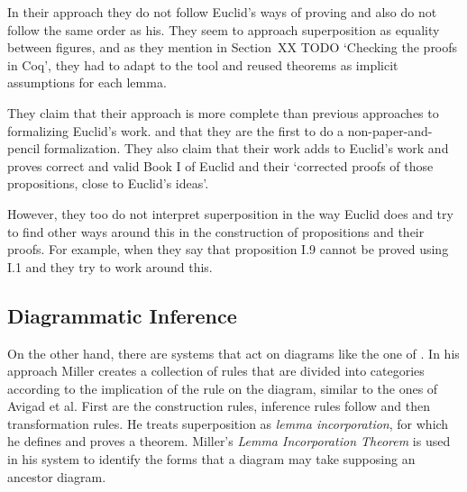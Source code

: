 \documentclass[]{interact}
\theoremstyle{plain}
\theoremstyle{definition}
\theoremstyle{remark}
\newcommand{\term}[1]{\emph{#1\/}}
\newcommand{\quotes}[1]{`#1'}
\begin{document}

In their approach they do not follow Euclid's ways of proving and also
do not follow the same order as his. They seem to approach
superposition as equality between figures, and as they mention in
Section~XX TODO \quotes{Checking the proofs in Coq},
they had to adapt to the tool and
reused theorems as implicit assumptions for each lemma.


They claim that their approach is more complete than previous
approaches to formalizing Euclid's work.  and that they are the first
to do a non-paper-and-pencil formalization.
They also claim that their work
  adds to Euclid's work
and
  proves correct and valid
      Book I of Euclid
    and
      their
      \quotes{corrected proofs of those propositions, close to Euclid's ideas}.


However, they too do not interpret superposition in the way Euclid
does and try to find other ways around this in the construction of
propositions and their proofs. For example, when they say that
proposition I.9 cannot be proved using I.1 and they try to work around
this.


\subsection{Diagrammatic Inference}
\label{sec:diagr-infer}

On the other hand, there are systems that act on diagrams like the one
of \citet{miller:2001}. In his approach Miller creates a
collection of rules that are divided into categories according to the
implication of the rule on the diagram, similar to the ones of Avigad
et al. First are the construction rules, inference rules follow and
then transformation rules. He treats superposition as
\term{lemma incorporation}, for which he defines and proves a theorem.
Miller's \term{Lemma Incorporation Theorem} is used in his system to
identify the forms that a diagram may take supposing an ancestor diagram.
\end{document}
